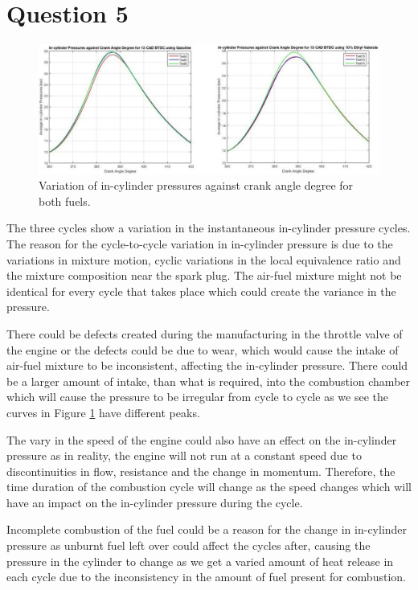 \documentclass[11pt]{article}
\begin{document}
\section{Question 5}
\begin{figure}[H]
    \centering
    \includegraphics[width = \textwidth]{./img/diagram3.png}
    \caption{Variation of in-cylinder pressures against crank angle degree for both fuels.}
    \label{q5-f1}
\end{figure}
The three cycles show a variation in the instantaneous in-cylinder pressure cycles. The reason for the cycle-to-cycle variation in in-cylinder pressure is due to the variations in mixture motion, cyclic variations in the local equivalence ratio and the mixture composition near the spark plug. The air-fuel mixture might not be identical for every cycle that takes place which could create the variance in the pressure.  

There could be defects created during the manufacturing in the throttle valve of the engine or the defects could be due to wear, which would cause the intake of air-fuel mixture to be inconsistent, affecting the in-cylinder pressure. There could be a larger amount of intake, than what is required, into the combustion chamber which will cause the pressure to be irregular from cycle to cycle as we see the curves in Figure \ref{q5-f1} have different peaks. 

The vary in the speed of the engine could also have an effect on the in-cylinder pressure as in reality, the engine will not run at a constant speed due to discontinuities in flow, resistance and the change in momentum. Therefore, the time duration of the combustion cycle will change as the speed changes which will have an impact on the in-cylinder pressure during the cycle.  

Incomplete combustion of the fuel could be a reason for the change in in-cylinder pressure as unburnt fuel left over could affect the cycles after, causing the pressure in the cylinder to change as we get a varied amount of heat release in each cycle due to the inconsistency in the amount of fuel present for combustion. 
\end{document}
